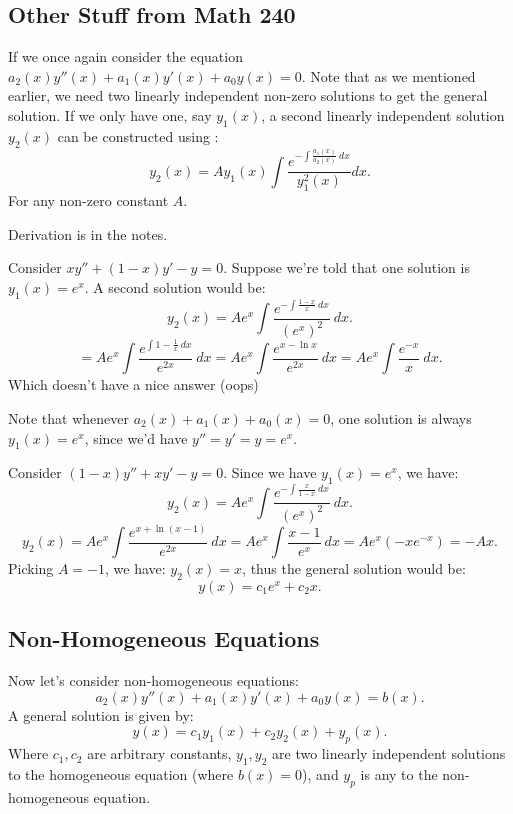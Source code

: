 \documentclass[../main/main.tex]{subfiles}
\begin{document}
\subsection{Other Stuff from Math 240}
If we once again consider the equation $a_2(x)y''(x)+a_1(x)y'(x)+a_0y(x)=0$. Note that as we mentioned earlier, we need two linearly independent non-zero solutions to get the general solution. If we only have one, say $y_1(x)$, a second linearly independent solution $y_2(x)$ can be constructed using  : \[
	y_2(x) = Ay_1(x) \int \frac{e^{-\int \frac{a_1(x)}{a_2(x)}~dx}}{y_1^2(x)}dx
.\] For any non-zero constant $A$.

\begin{remark}
	Derivation is in the notes.
\end{remark}
\begin{example}
	Consider $xy''+(1-x)y'-y=0$. Suppose we're told that one solution is  $y_1(x)=e^{x}$. A second solution would be: \[
		y_2(x) = Ae^{x}\int \frac{e^{- \int \frac{1-x}{x}~dx}}{(e^{x})^2}~dx
	.\] \[ 
	 = Ae^{x}\int \frac{e^{\int 1-\frac{1}{x}~dx}}{e^{2x}}~dx
	 = Ae^{x}\int \frac{e^{x-\ln x}}{e^{2x}}~dx
	 = Ae^{x}\int \frac{e^{-x}}{x}~dx
 .\] Which doesn't have a nice answer (oops)
\end{example}
\begin{remark}
	Note that whenever $a_2(x)+a_1(x)+a_0(x)=0$, one solution is always $y_1(x)=e^{x}$, since we'd have $y''=y'=y=e^{x}$.
\end{remark}
\begin{example}\label{nonhom1}
	Consider $(1-x)y''+xy'-y=0$. Since we have $y_1(x) = e^{x}$, we have: \[ 
		y_2(x) = Ae^{x}\int \frac{e^{- \int \frac{x}{1-x}~dx}}{(e^{x})^2}~dx
	.\]\[ 
y_2(x) = Ae^{x}\int \frac{e^{x+\ln(x-1)}}{e^{2x}}~dx =Ae^{x}\int \frac{x-1}{e^{x}}~dx = Ae^{x}(-xe^{-x})=-Ax
	.\]  Picking $A=-1$, we have: $y_2(x) = x$, thus the general solution would be: \[
	y(x) = c_1e^{x}+c_2x
	.\] 
\end{example}
\subsection{Non-Homogeneous Equations}
Now let's consider non-homogeneous equations: \[
	a_2(x)y''(x)+a_1(x)y'(x)+a_0y(x)=b(x)
.\] A general solution is given by: \[
y(x)=c_1y_1(x)+c_2y_2(x)+y_p(x)
.\] Where $c_1,c_2$ are arbitrary constants, $y_1,y_2$ are two linearly independent solutions to the homogeneous equation (where $b(x)= 0$), and  $y_p$ is any  to the non-homogeneous equation.
\end{document}

